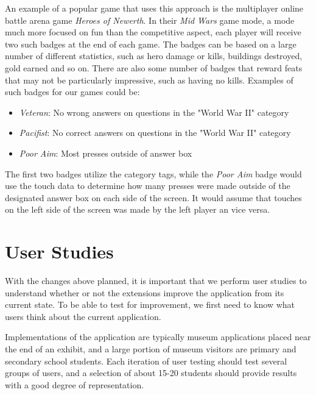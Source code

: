 An example of a popular game that uses this approach is the multiplayer online battle arena game \emph{Heroes of Newerth}\citep{Newerth}. In their \emph{Mid Wars} game mode, a mode much more focused on fun than the competitive aspect, each player will receive two such badges at the end of each game. The badges can be based on a large number of different statistics, such as hero damage or kills, buildings destroyed, gold earned and so on\citep{MidWars}. There are also some number of badges that reward feats that may not be particularly impressive, such as having no kills. Examples of such badges for our games could be:
\begin{itemize}
	\item \emph{Veteran}: No wrong answers on questions in the "World War II" category
	\item \emph{Pacifist}: No correct answers on questions in the "World War II" category
	\item \emph{Poor Aim}: Most presses outside of answer box
\end{itemize}

The first two badges utilize the category tags, while the \emph{Poor Aim} badge would use the touch data to determine how many presses were made outside of the designated answer box on each side of the screen. It would assume that touches on the left side of the screen was made by the left player an vice versa.


\section{User Studies}

With the changes above planned, it is important that we perform user studies to understand whether or not the extensions improve the application from its current state. To be able to test for improvement, we first need to know what users think about the current application.

Implementations of the application are typically museum applications placed near the end of an exhibit, and a large portion of museum visitors are primary and secondary school students. Each iteration of user testing should test several groups of users, and a selection of about 15-20 students should provide results with a good degree of representation.

